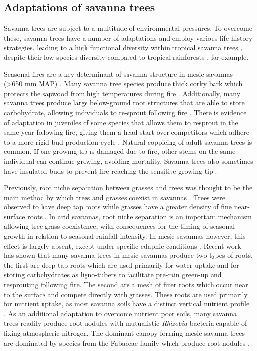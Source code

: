\begin{refsection}
\subsection{Adaptations of savanna trees}
\label{background:ssec:adapt}

Savanna trees are subject to a multitude of environmental pressures. To overcome these, savanna trees have a number of adaptations and employ various life history strategies, leading to a high functional diversity within tropical savanna trees \citep{Solbrig1996}, despite their low species diversity compared to tropical rainforests \citep{Solbrig1996}, for example.

Seasonal fires are a key determinant of savanna structure in mesic savannas (>650 mm MAP) \citep{Sankaran2005}. Many savanna tree species produce thick corky bark which protects the sapwood from high temperatures during fire \citep{Hoffmann2012, Lawes2011, Dantas2013}. Additionally, many savanna trees produce large below-ground root structures that are able to store carbohydrate, allowing individuals to re-sprout following fire \citep{Wigley2019}. There is evidence of adaptation in juveniles of some species that allows them to resprout in the same year following fire, giving them a head-start over competitors which adhere to a more rigid bud production cycle \citep{Wiegand2006}. Natural coppicing of adult savanna trees is common. If one growing tip is damaged due to fire, other stems on the same individual can continue growing, avoiding mortality. Savanna trees also sometimes have insulated buds to prevent fire reaching the sensitive growing tip \citep{CharlesDominique2015}.

Previously, root niche separation between grasses and trees was thought to be the main method by which trees and grasses coexist in savannas \citep{Walter1971}. Trees were observed to have deep tap roots while grasses have a greater density of fine near-surface roots \citep{Timberlake1993}. In arid savannas, root niche separation is an important mechanism allowing tree-grass coexistence, with consequences for the timing of seasonal growth in relation to seasonal rainfall intensity. In mesic savannas however, this effect is largely absent, except under specific edaphic conditions \citep{Case2020, Ketter2018, Sankaran2004, Higgins2000}. Recent work has shown that many savanna trees in mesic savannas produce two types of roots, the first are deep tap roots which are used primarily for water uptake and for storing carbohydrates as ligno-tubers to facilitate pre-rain green-up and resprouting following fire. The second are a mesh of finer roots which occur near to the surface and compete directly with grasses. These roots are used primarily for nutrient uptake, as most savanna soils have a distinct vertical nutrient profile \citep{Tomlinson2012, February2013}.  As an additional adaptation to overcome nutrient poor soils, many savanna trees readily produce root nodules with mutualistic \textit{Rhizobia} bacteria capable of fixing atmospheric nitrogen. The dominant canopy forming mesic savanna trees are dominated by species from the Fabaceae family which produce root nodules \citep{Hogberg1986}. 


\end{refsection}
